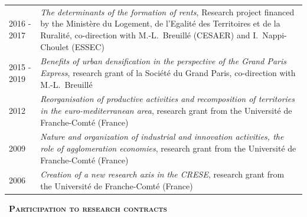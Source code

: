 \documentclass[a4paper,12pt]{article}
\newcommand{\smalltitre}[1]{%
	\noindent \textbullet~\textsc{\textbf{#1}}
	\smallskip
	}
\begin{document}
\begin{longtable}{@{}p{\annee}p{\texte}@{}}
2016 - 2017 & \og{}\textit{The determinants of the formation of rents}\fg{}, Research project financed by the Ministère du Logement, de l'Egalité des Territoires et de la Ruralité, co-direction with M.-L.~Breuillé (CESAER) and I.~Nappi-Choulet (ESSEC) \\
2015 - 2019 & \og{}\textit{Benefits of urban densification in the perspective of the Grand Paris Express}\fg{}, research grant of la Société du Grand Paris, co-direction with M.-L.~Breuillé \\
2012 & \og{}\textit{Reorganisation of productive activities and recomposition of territories in the euro-mediterranean area}\fg{}, research grant from the Université de Franche-Comté (France) \\
2009 & \og{}\textit{Nature and organization of industrial and innovation activities, the role of agglomeration economies}\fg{}, research grant from the Université de Franche-Comté (France) \\
2006 & \og{}\textit{Creation of a new research axis in the CRESE}\fg{}, research grant from the Université de Franche-Comté (France) \\

\end{longtable}

\smalltitre{Participation to research contracts}
\end{document}
